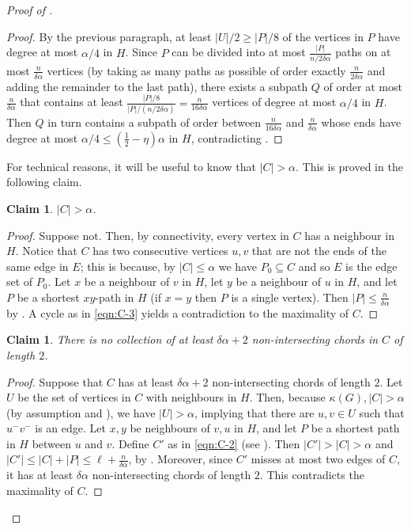 \documentclass[11pt,english]{article}
\theoremstyle{plain}
\newtheorem{claim}[theorem]{Claim}
\theoremstyle{definition}
\theoremstyle{remark}
\newcommand{\shoham}[1]{ 
	\begin{framed}
		#1
	\end{framed}
}
\def \um {u^-}
\def \vm {v^-}
\begin{document}
\begin{proof}[Proof of ]
\begin{proof}
				By the previous paragraph, at least $|U|/2 \ge |P|/8$ of the vertices in $P$ have degree at most $\alpha/4$ in $H$. 
				Since $P$ can be divided into at most $\frac{|P|}{n/2\delta \alpha}$ paths on at most $\frac{n}{\delta \alpha}$ vertices (by taking as many paths as possible of order exactly $\frac{n}{2\delta \alpha}$ and adding the remainder to the last path), there exists a subpath $Q$ of order at most $\frac{n}{\delta \alpha}$ that contains at least $\frac{|P|/8}{|P|/(n/2\delta\alpha)} = \frac{n}{16\delta\alpha}$ vertices of degree at most $\alpha/4$ in $H$. 
				Then $Q$ in turn contains a subpath of order between $\frac{n}{16\delta\alpha}$ and $\frac{n}{\delta\alpha}$ whose ends have degree at most $\alpha/4 \le (\frac{1}{2} - \eta)\alpha$ in $H$, contradicting .
			\end{proof}

			For technical reasons, it will be useful to know that $|C| > \alpha$. This is proved in the following claim.

			\begin{claim} \label{claim:C-length}
				$|C| > \alpha$.
			\end{claim}

			\begin{proof}
				Suppose not. Then, by connectivity, every vertex in $C$ has a neighbour in $H$.
				Notice that $C$ has two consecutive vertices $u,v$ that are not the ends of the same edge in $E$; this is because, by $|C| \le \alpha$ we have $P_0 \subseteq C$ and so $E$ is the edge set of $P_0$.
				Let $x$ be a neighbour of $v$ in $H$, let $y$ be a neighbour of $u$ in $H$, and let $P$ be a shortest $xy$-path in $H$ (if $x = y$ then $P$ is a single vertex). Then $|P| \le \frac{n}{\delta\alpha}$ by . A cycle as in \eqref{eqn:C-3} yields a contradiction to the maximality of $C$.
			\end{proof}

			\begin{claim} \label{claim:chords}
				There is no collection of at least $\delta \alpha + 2$ non-intersecting chords in $C$ of length $2$.
			\end{claim}

			\begin{proof}
				Suppose that $C$ has at least $\delta \alpha + 2$ non-intersecting chords of length $2$.
				Let $U$ be the set of vertices in $C$ with neighbours in $H$.
				Then, because $\kappa(G), |C| > \alpha$ (by assumption and ), we have $|U| > \alpha$, implying that there are $u,v \in U$ such that $\um \vm$ is an edge. 
				Let $x,y$ be neighbours of $v, u$ in $H$, and let $P$ be a shortest path in $H$ between $u$ and $v$. Define $C'$ as in \eqref{eqn:C-2} (see ). Then $|C'| > |C| > \alpha$ and $|C'| \le |C| + |P| \le \ell + \frac{n}{\delta \alpha}$, by . Moreover, since $C'$ misses at most two edges of $C$, it has at least $\delta \alpha$ non-intersecting chords of length $2$. This contradicts the maximality of $C$.
			\end{proof}


\end{proof}
\end{document}
